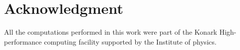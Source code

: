 \section*{Acknowledgment}
All the computations performed in this work were part of the Konark High-performance computing facility supported by the Institute of physics.

